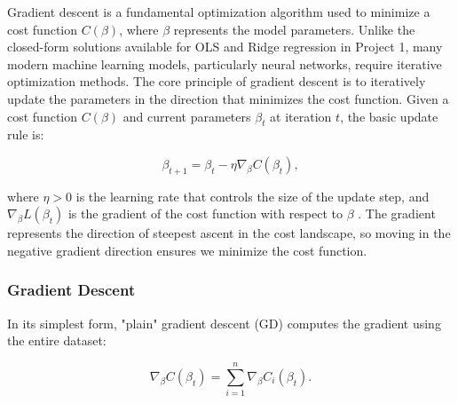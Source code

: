 \documentclass[aps,pra,english,notitlepage,reprint,nofootinbib]{revtex4-1}  %
\begin{document}
Gradient descent is a fundamental optimization algorithm used to minimize a cost function \( C(\beta) \), where \( \beta \) represents the model parameters. Unlike the closed-form solutions available for OLS and Ridge regression in Project 1, many modern machine learning models, particularly neural networks, require iterative optimization methods. The core principle of gradient descent is to iteratively update the parameters in the direction that minimizes the cost function. Given a cost function \( C(\beta) \) and current parameters \( \beta_t \) at iteration \(t\), the basic update rule is:

\begin{equation}
    \beta_{t+1} = \beta_t - \eta \nabla_\beta C(\beta_t),
\end{equation}

where \( \eta > 0 \) is the learning rate that controls the size of the update step, and \( \nabla_\beta L(\beta_t) \) is the gradient of the cost function with respect to \( \beta \) . The gradient represents the direction of steepest ascent in the cost landscape, so moving in the negative gradient direction ensures we minimize the cost function.

\subsubsection{Gradient Descent}

In its simplest form, "plain" gradient descent (GD) computes the gradient using the entire dataset:

\begin{equation}
    \nabla_\beta C(\beta_t) = \sum_{i=1}^{n} \nabla_\beta C_i(\beta_t).
\end{equation}
\end{document}
